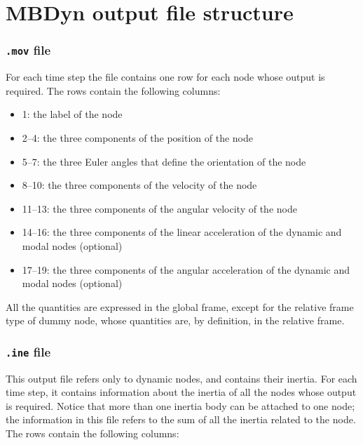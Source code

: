 

\newpage

\section{MBDyn output file structure}
\label{sec:mbdyn-output-file}

\subsubsection{\texttt{.mov} file}

For each time step the file contains one row for each node whose output is required. The rows contain the following columns:
\begin{itemize}
    \item 1: the label of the node
    \item 2–4: the three components of the position of the node
    \item 5–7: the three Euler angles that define the orientation of the node
    \item 8–10: the three components of the velocity of the node
    \item 11–13: the three components of the angular velocity of the node
    \item 14–16: the three components of the linear acceleration of the dynamic and modal nodes (optional)
    \item 17–19: the three components of the angular acceleration of the dynamic and modal nodes (optional)
\end{itemize}

All the quantities are expressed in the global frame, except for the relative frame type of dummy node, whose quantities are, by definition, in the relative frame.

\subsubsection{\texttt{.ine} file}

This output file refers only to dynamic nodes, and contains their inertia. For each time step, it contains information about the inertia of all the nodes whose output is required. Notice that more than one inertia body can be attached to one node; the information in this file refers to the sum of all the inertia related to the node.
The rows contain the following columns:

